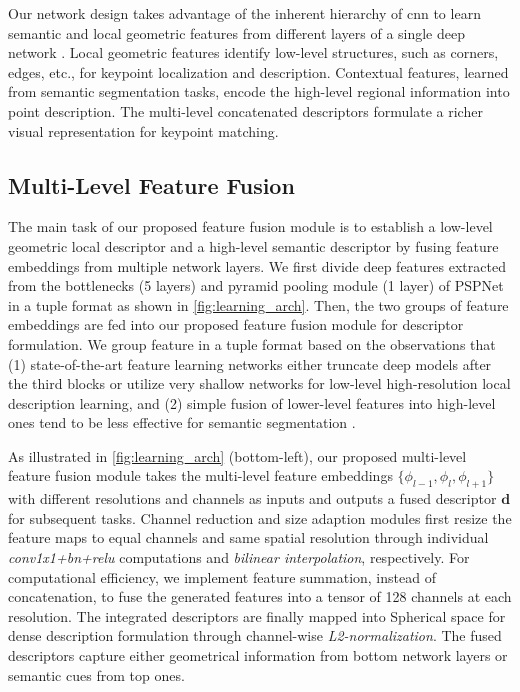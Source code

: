 Our network design takes advantage of the inherent hierarchy of \acrshort{cnn} to learn semantic and local geometric features from different layers of a single deep network \cite{hariharan2015hypercolumns}.  
Local geometric features identify low-level structures, such as corners, edges, etc., for keypoint localization and description.
Contextual features, learned from semantic segmentation tasks, encode the high-level regional information into point description.  
The multi-level concatenated descriptors formulate a richer visual representation for keypoint matching.

\subsection{Multi-Level Feature Fusion}
The main task of our proposed feature fusion module is to establish a low-level geometric local descriptor and a high-level semantic descriptor by fusing feature embeddings from multiple network layers.
We first divide deep features extracted from the bottlenecks (5 layers) and pyramid pooling module (1 layer) of PSPNet in a tuple format as shown in \ref{fig:learning_arch}. 
Then, the two groups of feature embeddings are fed into our proposed feature fusion module for descriptor formulation. 
We group feature in a tuple format based on the observations that (1) state-of-the-art feature learning networks either truncate deep models after the third blocks \cite{dusmanu2019d2} or utilize very shallow networks \cite{detone2018superpoint,revaud2019r2d2,luo2020aslfeat} for low-level high-resolution local description learning, and (2) simple fusion of lower-level features into high-level ones tend to be less effective for
semantic segmentation \cite{zhang2018exfuse}.


As illustrated in \ref{fig:learning_arch} (bottom-left), our proposed multi-level feature fusion module takes the multi-level feature embeddings $\{ \phi_{l-1}, \phi_{l}, \phi_{l+1} \}$ with different resolutions and channels as inputs and outputs a fused descriptor $\mathbf{d}$ for subsequent tasks. 
Channel reduction and size adaption modules first resize the feature maps to equal channels and same spatial resolution through individual {\em conv1x1+bn+relu}
computations and {\em bilinear interpolation}, respectively. 
For computational efficiency, we implement feature summation, instead of concatenation, to fuse the generated features into a tensor of 128 channels at each resolution.  
The integrated descriptors are finally mapped into Spherical space for dense description formulation through channel-wise {\em L2-normalization}.
The fused descriptors capture either geometrical information from bottom network layers or semantic cues from top ones. 

